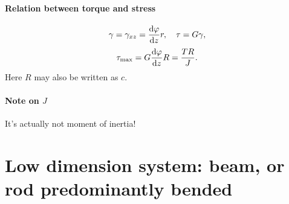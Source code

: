 \documentclass[hyperref, a4paper]{article}
\begin{document}
\paragraph*{Relation between torque and stress}
\begin{equation}
    \gamma = \gamma_{xz} = \dv{\varphi}{z} r, \quad \tau = G \gamma, 
\end{equation}
\begin{equation}
    \tau_\text{max} = G \dv{\varphi}{z} R 
    = \frac{T R}{J} .
\end{equation}
Here $R$ may also be written as $c$.

\paragraph*{Note on $J$} It's actually not moment of inertia! 

\section{Low dimension system: beam, or rod predominantly bended}
\end{document}

